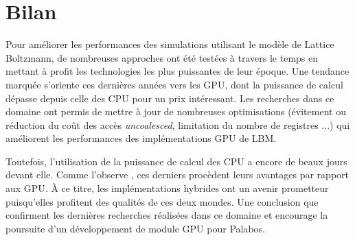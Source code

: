 \section{Bilan}
Pour améliorer les performances des simulations utilisant le modèle de Lattice Boltzmann, de nombreuses approches ont été testées à travers le temps en mettant à profit les technologies les plus puissantes de leur époque. Une tendance marquée s'oriente ces dernières années vers les \acs{GPU}, dont la puissance de calcul dépasse depuis celle des \acs{CPU} pour un prix intéressant. Les recherches dans ce domaine ont permis de mettre à jour de nombreuses optimisations (évitement ou réduction du coût des accès \textit{uncoalesced}, limitation du nombre de registres ...) qui améliorent les performances des implémentations \acs{GPU} de \acs{LBM}.

Toutefois, l'utilisation de la puissance de calcul des \acs{CPU} a encore de beaux jours devant elle. Comme l'observe \citet{kaufman_implementing_2009}, ces derniers procèdent leurs avantages par rapport aux \acs{GPU}. À ce titre, les implémentations hybrides ont un avenir prometteur puisqu'elles profitent des qualités de ces deux mondes. Une conclusion que confirment les dernières recherches réalisées dans ce domaine et encourage la poursuite d'un développement de module \acs{GPU} pour Palabos.
